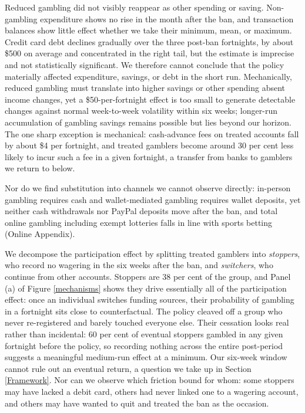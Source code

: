 \documentclass[11pt]{article}
\begin{document}
Reduced gambling did not visibly reappear as other spending or saving. Non-gambling expenditure shows no rise in the month after the ban, and transaction balances show little effect whether we take their minimum, mean, or maximum. Credit card debt declines gradually over the three post-ban fortnights, by about \$500 on average and concentrated in the right tail, but the estimate is imprecise and not statistically significant. We therefore cannot conclude that the policy materially affected expenditure, savings, or debt in the short run. Mechanically, reduced gambling must translate into higher savings or other spending absent income changes, yet a \$50-per-fortnight effect is too small to generate detectable changes against normal week-to-week volatility within six weeks; longer-run accumulation of gambling savings remains possible but lies beyond our horizon. The one sharp exception is mechanical: cash-advance fees on treated accounts fall by about \$4 per fortnight, and treated gamblers become around 30 per cent less likely to incur such a fee in a given fortnight, a transfer from banks to gamblers we return to below.

Nor do we find substitution into channels we cannot observe directly: in-person gambling requires cash and wallet-mediated gambling requires wallet deposits, yet neither cash withdrawals nor PayPal deposits move after the ban, and total online gambling including exempt lotteries falls in line with sports betting (Online Appendix).


We decompose the participation effect by splitting treated gamblers into \emph{stoppers}, who record no wagering in the six weeks after the ban, and \emph{switchers}, who continue from other accounts. Stoppers are 38 per cent of the group, and Panel (a) of Figure \ref{mechanisms} shows they drive essentially all of the participation effect: once an individual switches funding sources, their probability of gambling in a fortnight sits close to counterfactual. The policy cleaved off a group who never re-registered and barely touched everyone else. Their cessation looks real rather than incidental: 60 per cent of eventual stoppers gambled in any given fortnight before the policy, so recording nothing across the entire post-period suggests a meaningful medium-run effect at a minimum. Our six-week window cannot rule out an eventual return, a question we take up in Section \ref{Framework}. Nor can we observe which friction bound for whom: some stoppers may have lacked a debit card, others had never linked one to a wagering account, and others may have wanted to quit and treated the ban as the occasion.
\end{document}
